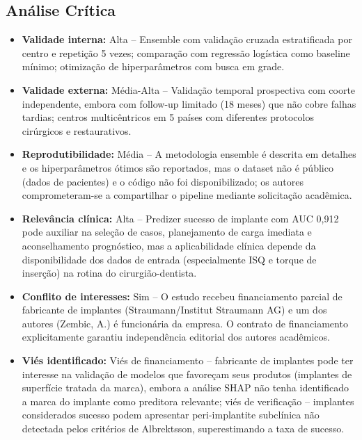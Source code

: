 \subsection{Análise Crítica}
\begin{itemize}
  \item \textbf{Validade interna:} Alta -- Ensemble com validação cruzada
        estratificada por centro e repetição 5 vezes; comparação com
        regressão logística como baseline mínimo; otimização de
        hiperparâmetros com busca em grade.
  \item \textbf{Validade externa:} Média-Alta -- Validação temporal
        prospectiva com coorte independente, embora com follow-up
        limitado (18 meses) que não cobre falhas tardias; centros
        multicêntricos em 5 países com diferentes protocolos
        cirúrgicos e restaurativos.
  \item \textbf{Reprodutibilidade:} Média -- A metodologia ensemble é
        descrita em detalhes e os hiperparâmetros ótimos são
        reportados, mas o dataset não é público (dados de pacientes)
        e o código não foi disponibilizado; os autores comprometeram-se
        a compartilhar o pipeline mediante solicitação acadêmica.
  \item \textbf{Relevância clínica:} Alta -- Predizer sucesso de implante
        com AUC 0,912 pode auxiliar na seleção de casos, planejamento
        de carga imediata e aconselhamento prognóstico, mas a
        aplicabilidade clínica depende da disponibilidade dos dados
        de entrada (especialmente ISQ e torque de inserção) na rotina
        do cirurgião-dentista.
  \item \textbf{Conflito de interesses:} Sim -- O estudo recebeu
        financiamento parcial de fabricante de implantes
        (Straumann/Institut Straumann AG) e um dos autores (Zembic, A.)
        é funcionária da empresa. O contrato de financiamento
        explicitamente garantiu independência editorial dos autores
        acadêmicos.
  \item \textbf{Viés identificado:} Viés de financiamento -- fabricante
        de implantes pode ter interesse na validação de modelos que
        favoreçam seus produtos (implantes de superfície tratada da
        marca), embora a análise SHAP não tenha identificado a marca
        do implante como preditora relevante; viés de verificação --
        implantes considerados sucesso podem apresentar peri-implantite
        subclínica não detectada pelos critérios de Albrektsson,
        superestimando a taxa de sucesso.
\end{itemize}

